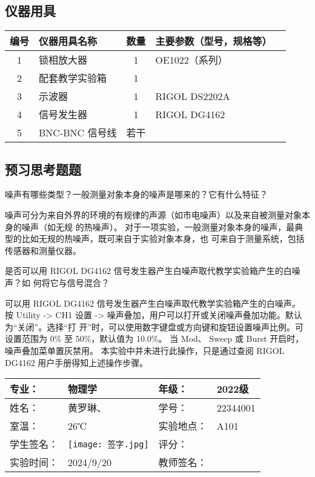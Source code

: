 \documentclass[dvipsnames, svgnames,a4paper,11pt]{article}
\begin{document}
	\subsection{仪器用具}
	\begin{center}
		\begin{tabular}{cm{4cm}cm{6cm}c}
				\hline
				编号 & 仪器用具名称 & 数量 & 主要参数（型号，规格等）  \\
				\hline
				1 & 锁相放大器 & 1 & OE1022（系列）   \\
				2 & 配套教学实验箱 & 1 &    \\
				3 & 示波器 & 1 & RIGOL DS2202A   \\
				4 & 信号发生器 & 1 & RIGOL DG4162  \\
				5 & BNC-BNC 信号线 & 若干 &    \\
				\hline
		\end{tabular}
		\end{center}
		

	
	
	
	\subsection{预习思考题题}
	
	\begin{question}
		噪声有哪些类型？一般测量对象本身的噪声是哪来的？它有什么特征？
	\end{question}
	噪声可分为来自外界的环境的有规律的声源（如市电噪声）以及来自被测量对象本身的噪声（如无规
的热噪声）。
对于一项实验，一般测量对象本身的噪声，最典型的比如无规的热噪声，既可来自于实验对象本身，也
可来自于测量系统，包括传感器和测量仪器。
	\begin{question}
		是否可以用 RIGOL DG4162 信号发生器产生白噪声取代教学实验箱产生的白噪声？如
何将它与信号混合？
	\end{question}
	可以用 RIGOL DG4162 信号发生器产生白噪声取代教学实验箱产生的白噪声。
按 Utility -> CH1 设置 -> 噪声叠加，用户可以打开或关闭噪声叠加功能。默认为“关闭”。选择“打
开”时，可以使用数字键盘或方向键和旋钮设置噪声比例。可设置范围为 0\% 至 50\%，默认值为 10.0\%。
当 Mod、 Sweep 或 Burst 开启时，噪声叠加菜单置灰禁用。
本实验中并未进行此操作，只是通过查阅 RIGOL DG4162 用户手册得知上述操作步骤。

	
	
	
	\clearpage
	\begin{table}
		\renewcommand\arraystretch{1.7}
		\centering
		\begin{tabularx}{\textwidth}{|X|X|X|X|}
			\hline
			专业： & 物理学 & 年级： & 2022级 \\
			\hline
			姓名： &黄罗琳、 & 学号： & 22344001\\
			\hline
			室温： & 26℃ & 实验地点： & A101 \\
			\hline
			学生签名：& \texttt{[image: 签字.jpg]}  & 评分： &\\
			\hline
			实验时间：& 2024/9/20 & 教师签名：&\\
			\hline
		\end{tabularx}
	\end{table}
	
\end{document}
